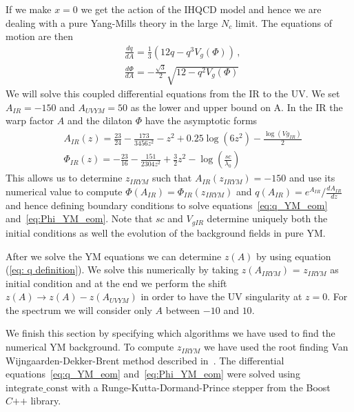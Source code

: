 \documentclass[a4paper,12pt]{article}
\begin{document}
If we make $x = 0$ we get the action of the IHQCD model and hence we are dealing with a pure Yang-Mills theory in the large $N_c$ limit. The equations of motion are then
\begin{align}
&\frac{dq}{dA} = \frac{1}{3} \left( 12 q - q^3 V_g \left(\Phi\right) \right) \, , \label{eq:q_YM_eom} \\
&\frac{d\Phi}{dA} = - \frac{\sqrt{3}}{2} \sqrt{12 - q^2 V_g\left(\Phi\right)} \label{eq:Phi_YM_eom}
\end{align}
We will solve this coupled differential equations from the IR to the UV. We set $A_{IR} = -150$ and $A_{UVYM} = 50$ as the lower and upper bound on A. In the IR the warp factor $A$ and the dilaton $\Phi$ have the asymptotic forms
\begin{align}
&A_{IR} \left(z\right) = \frac{23}{24} - \frac{173}{3456 z^2} - z^2 + 0.25 \log(6 z^2) - \frac{\log(Vg_{IR})}{2} \\
&\Phi_{IR} \left(z \right) = - \frac{23}{16} - \frac{151}{2304 z^2} + \frac{3}{2} z^2 - \log(\frac{sc}{\lambda_0})
\label{eq: YM fields IR asymptotics}
\end{align}
This allows us to determine $z_{IRYM}$ such that $A_{IR}\left(z_{IRYM}\right) = -150$ and use its numerical value to compute $\Phi\left(A_{IR}\right) = \Phi_{IR} \left( z_{IRYM}\right)$ and $q\left(A_{IR}\right) = e^{A_{IR}} / \frac{dA_{IR}}{d z} $ and hence defining boundary conditions to solve equations~\ref{eq:q_YM_eom} and~\ref{eq:Phi_YM_eom}. Note that $sc$ and $V_{gIR}$ determine uniquely both the initial conditions as well the evolution of the background fields in pure YM.

After we solve the YM equations we can determine $z\left(A\right)$ by using equation (\ref{eq: q definition}). We solve this numerically by taking $z(A_{IRYM})$ = $z_{IRYM}$ as initial condition and at the end we perform the shift $z\left(A\right) \to z\left(A\right) - z\left(A_{UVYM} \right) $ in order to have the UV singularity at $z = 0$. For the spectrum we will consider only  $A$ between $-10$ and $10$.

We finish this section by specifying which algorithms we have used to find the numerical YM background. To compute $z_{IRYM}$ we have used the root finding Van Wijngaarden-Dekker-Brent method described in~\cite{10.5555/1403886}. The differential equations~\ref{eq:q_YM_eom} and~\ref{eq:Phi_YM_eom} were solved using $\text{integrate\_const}$ with a Runge-Kutta-Dormand-Prince stepper from the Boost $C\texttt{++}$ library.
\end{document}
